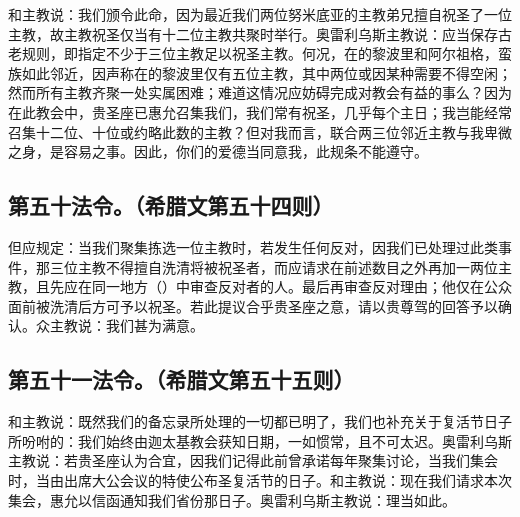 和主教说：我们颁令此命，因为最近我们两位努米底亚的主教弟兄擅自祝圣了一位主教，故主教祝圣仅当有十二位主教共聚时举行。奥雷利乌斯主教说：应当保存古老规则，即指定不少于三位主教足以祝圣主教。何况，在的黎波里和阿尔祖格，蛮族如此邻近，因声称在的黎波里仅有五位主教，其中两位或因某种需要不得空闲；然而所有主教齐聚一处实属困难；难道这情况应妨碍完成对教会有益的事么？因为在此教会中，贵圣座已惠允召集我们，我们常有祝圣，几乎每个主日；我岂能经常召集十二位、十位或约略此数的主教？但对我而言，联合两三位邻近主教与我卑微之身，是容易之事。因此，你们的爱德当同意我，此规条不能遵守。\par


\subsection{第五十法令。（希腊文第五十四则）}

\par

但应规定：当我们聚集拣选一位主教时，若发生任何反对，因我们已处理过此类事件，那三位主教不得擅自洗清将被祝圣者，而应请求在前述数目之外再加一两位主教，且先应在同一地方（）中审查反对者的人。最后再审查反对理由；他仅在公众面前被洗清后方可予以祝圣。若此提议合乎贵圣座之意，请以贵尊驾的回答予以确认。众主教说：我们甚为满意。\par


\subsection{第五十一法令。（希腊文第五十五则）}

\par

和主教说：既然我们的备忘录所处理的一切都已明了，我们也补充关于复活节日子所吩咐的：我们始终由迦太基教会获知日期，一如惯常，且不可太迟。奥雷利乌斯主教说：若贵圣座认为合宜，因我们记得此前曾承诺每年聚集讨论，当我们集会时，当由出席大公会议的特使公布圣复活节的日子。和主教说：现在我们请求本次集会，惠允以信函通知我们省份那日子。奥雷利乌斯主教说：理当如此。\par


